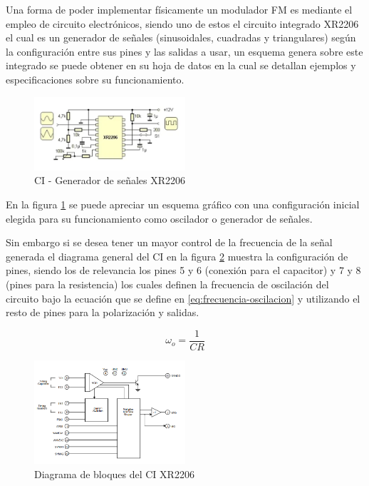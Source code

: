 \documentclass[conference]{IEEEtran}
\begin{document}
	Una forma de poder implementar físicamente un modulador FM es mediante el empleo de circuito electrónicos, siendo uno de estos el circuito integrado XR2206 el cual es un generador de señales (sinusoidales, cuadradas y triangulares) según la configuración entre sus pines y las salidas a usar, un esquema genera sobre este integrado se puede obtener en su hoja de datos en la cual se detallan ejemplos y especificaciones sobre su funcionamiento.
	
	\begin{figure}[h]
		\centering
		\includegraphics[width=0.5\textwidth]{media/integrado-xr2206}
		\caption{CI - Generador de señales XR2206}
		\label{fig:integrado-xr2206}
	\end{figure}
	
	En la figura \ref{fig:integrado-xr2206} se puede apreciar un esquema gráfico con una configuración inicial elegida para su funcionamiento como oscilador o generador de señales.
	
	Sin embargo si se desea tener un mayor control de la frecuencia de la señal generada el diagrama general del CI en la figura \ref{fig:diagrama-bloques-xr2206} muestra la configuración de pines, siendo los de relevancia los pines 5 y 6 (conexión para el capacitor) y 7 y 8 (pines para la resistencia) los cuales definen la frecuencia de oscilación del circuito bajo la ecuación que se define en \ref{eq:frecuencia-oscilacion} y utilizando el resto de pines para la polarización y salidas.
	
	\begin{equation}
		\omega_o = \frac{1}{CR}
		\label{eq:frecuencia-oscilacion}
	\end{equation}
	
	\begin{figure}[h]
		\centering
		\includegraphics[width=0.5\textwidth]{media/diagrama-bloques-xr2206}
		\caption{Diagrama de bloques del CI XR2206}
		\label{fig:diagrama-bloques-xr2206}
	\end{figure}
	
\end{document}
